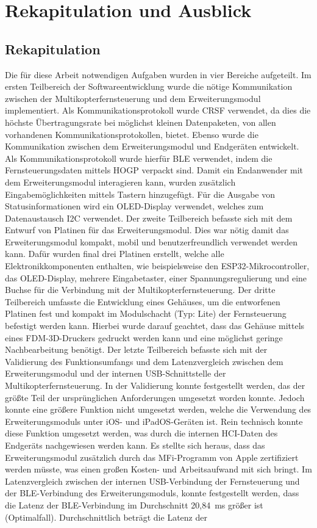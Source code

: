 
\chapter{Rekapitulation und Ausblick}
\section{Rekapitulation}

Die für diese Arbeit notwendigen Aufgaben wurden in vier Bereiche aufgeteilt. Im ersten Teilbereich der Softwareentwicklung wurde die nötige Kommunikation zwischen der Multikopterfernsteuerung und dem Erweiterungsmodul implementiert. Als Kommunikationsprotokoll wurde CRSF verwendet, da dies die höchste Übertragungsrate bei möglichst kleinen Datenpaketen, von allen vorhandenen Kommunikationsprotokollen, bietet. Ebenso wurde die Kommunikation zwischen dem Erweiterungsmodul und Endgeräten entwickelt. Als Kommunikationsprotokoll wurde hierfür \ac{BLE} verwendet, indem die Fernsteuerungsdaten mittels \ac{HOGP} verpackt sind. Damit ein Endanwender mit dem Erweiterungsmodul interagieren kann, wurden zusätzlich Eingabemöglichkeiten mittels Tastern hinzugefügt. Für die Ausgabe von Statusinformationen wird ein \ac{OLED}-Display verwendet, welches zum Datenaustausch \ac{I2C} verwendet. Der zweite Teilbereich befasste sich mit dem Entwurf von Platinen für das Erweiterungsmodul. Dies war nötig damit das Erweiterungsmodul kompakt, mobil und benutzerfreundlich verwendet werden kann. Dafür wurden final drei Platinen erstellt, welche alle Elektronikkomponenten enthalten, wie beispielsweise den ESP32-Mikrocontroller, das \ac{OLED}-Display, mehrere Eingabetaster, einer Spannungsregulierung und eine Buchse für die Verbindung mit der Multikopterfernsteuerung. Der dritte Teilbereich umfasste die Entwicklung eines Gehäuses, um die entworfenen Platinen fest und kompakt im Modulschacht (Typ: Lite) der Fernsteuerung befestigt werden kann. Hierbei wurde darauf geachtet, dass das Gehäuse mittels eines \ac{FDM}-3D-Druckers gedruckt werden kann und eine möglichst geringe Nachbearbeitung benötigt. Der letzte Teilbereich befasste sich mit der Validierung des Funktionsumfangs und dem Latenzvergleich zwischen dem Erweiterungsmodul und der internen USB-Schnittstelle der Multikopterfernsteuerung. In der Validierung konnte festgestellt werden, das der größte Teil der ursprünglichen Anforderungen umgesetzt worden konnte. Jedoch konnte eine größere Funktion nicht umgesetzt werden, welche die Verwendung des Erweiterungsmoduls unter iOS- und iPadOS-Geräten ist. Rein technisch konnte diese Funktion umgesetzt werden, was durch die internen \ac{HCI}-Daten des Endgeräts nachgewiesen werden kann. Es stellte sich heraus, dass das Erweiterungsmodul zusätzlich durch das \ac{MFi}-Programm von Apple zertifiziert werden müsste, was einen großen Kosten- und Arbeitsaufwand mit sich bringt. Im Latenzvergleich zwischen der internen USB-Verbindung der Fernsteuerung und der \ac{BLE}-Verbindung des Erweiterungsmoduls, konnte festgestellt werden, dass die Latenz der \ac{BLE}-Verbindung im Durchschnitt 20,84~ms größer ist (Optimalfall). Durchschnittlich beträgt die Latenz der 